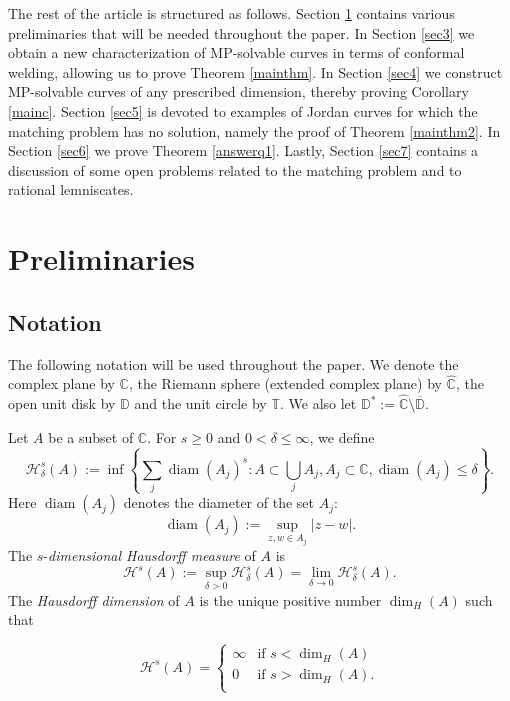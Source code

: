 \documentclass{amsart}
\theoremstyle{plain}
\theoremstyle{definition}
\theoremstyle{remark}
\newcommand{\mC}{\mathbb{C}}
\newcommand{\mD}{\mathbb{D}}
\newcommand{\mT}{\mathbb{T}}
\newcommand{\hC}{\widehat{\mathbb{C}}}
\begin{document}
The rest of the article is structured as follows. Section \ref{sec2} contains various preliminaries that will be needed throughout the paper. In Section \ref{sec3} we obtain a new characterization of MP-solvable curves in terms of conformal welding, allowing us to prove Theorem \ref{mainthm}. In Section \ref{sec4} we construct MP-solvable curves of any prescribed dimension, thereby proving Corollary \ref{mainc}. Section \ref{sec5} is devoted to examples of Jordan curves for which the matching problem has no solution, namely the proof of Theorem \ref{mainthm2}. In Section \ref{sec6} we prove Theorem \ref{answerq1}. Lastly, Section \ref{sec7} contains a discussion of some open problems related to the matching problem and to rational lemniscates.


\section{Preliminaries}
\label{sec2}

\subsection{Notation}

The following notation will be used throughout the paper. We denote the complex plane by $\mC$, the Riemann sphere (extended complex plane) by $\hC$, the open unit disk by $\mD$ and the unit circle by $\mT$. We also let $\mD^*:=\hC \setminus \overline{\mD}$.

Let $A$ be a subset of $\mC$. For $s \geq 0$ and $0<\delta \leq \infty$, we define
$$\mathcal{H}_{\delta}^{s}(A):= \inf \left\{ \sum_j \operatorname{diam}(A_j)^s : A \subset \bigcup_j A_j, A_j \subset \mC, \operatorname{diam}(A_j) \leq \delta \right\}.$$
Here $\operatorname{diam}(A_j)$ denotes the diameter of the set $A_j$:
$$\operatorname{diam}(A_j):=\sup_{z,w \in A_j} |z-w|.$$
The $s$-\textit{dimensional Hausdorff measure} of $A$ is
$$\mathcal{H}^s(A) := \sup_{\delta>0} \mathcal{H}_{\delta}^s(A) = \lim_{\delta \to 0} \mathcal{H}_{\delta}^s(A).$$
The \textit{Hausdorff dimension} of $A$ is the unique positive number $\operatorname{dim}_H(A)$ such that

\begin{displaymath}
\mathcal{H}^{s}(A) = \left\{ \begin{array}{ll}
\infty & \textrm{if $s < \dim_H(A) $}\\
0 & \textrm{if $s>\dim_H(A)$}.\\
\end{array} \right.
\end{displaymath}
\end{document}
